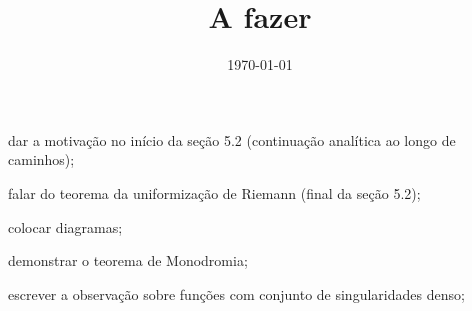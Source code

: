 \documentclass[12pt,a4paper]{article}
\title{A fazer}
\author{}
\date{\today}
\newcommand{\cmark}{\ding{51}}%
\newcommand{\done}{\rlap{$\square$}{\raisebox{2pt}{\large\hspace{1pt}\cmark}}%
\hspace{-2.5pt}}
\begin{document}
\maketitle

\begin{todolist}
    \item dar a motivação no início da seção 5.2 (continuação analítica ao longo
    de caminhos);
    \item falar do teorema da uniformização de Riemann (final da seção 5.2); 
    \item colocar diagramas;
    \item demonstrar o teorema de Monodromia;
    \item escrever a observação sobre funções com conjunto de singularidades denso;

\end{todolist}
\end{document}
